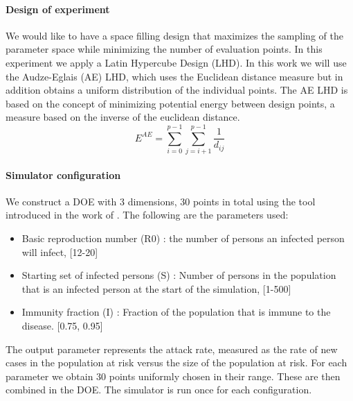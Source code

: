 \paragraph{Design of experiment}
We would like to have a space filling design that maximizes the sampling of the parameter space while minimizing the number of evaluation points.
In this experiment we apply a Latin Hypercube Design (LHD). 
In this work we will use the Audze-Eglais \citep{AudzeEglais, AudzeEglais2, AudzeEglais3} (AE) LHD, which uses the Euclidean distance measure but in addition obtains a uniform distribution of the individual points. 
The AE LHD is based on the concept of minimizing potential energy between design points, a measure based on the inverse of the euclidean distance.
\[
E^{AE} = \sum_{i=0}^{p-1} {\sum_{j=i+1}^{p-1} {\frac{1}{d_{ij}}}}
\]
\paragraph{Simulator configuration}
We construct a DOE with 3 dimensions, 30 points in total using the tool introduced in the work of \citep{DOE}. 
The following are the parameters used:
\begin{itemize}
\item Basic reproduction number (R0) : the number of persons an infected person will infect, [12-20]
\item Starting set of infected persons (S) : Number of persons in the population that is an infected person at the start of the simulation, [1-500]
\item Immunity fraction (I) : Fraction of the population that is immune to the disease. [0.75, 0.95]
\end{itemize}
The output parameter represents the attack rate, measured as the rate of new cases in the population at risk versus the size of the population at risk.
For each parameter we obtain 30 points uniformly chosen in their range. These are then combined in the DOE.
The simulator is run once for each configuration. 
